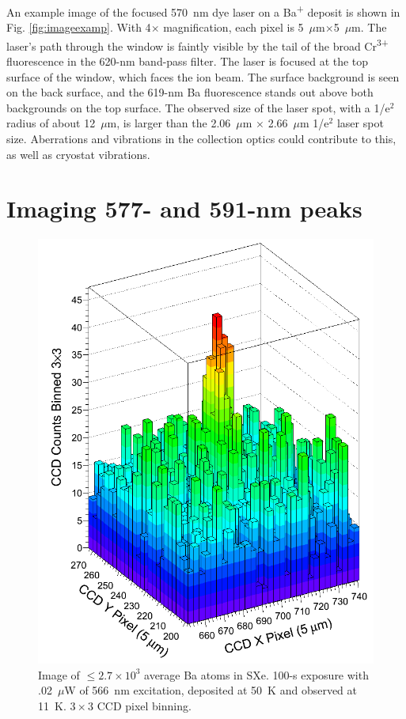 An example image of the focused 570~nm dye laser on a Ba\textsuperscript{+} deposit is shown in Fig. \ref{fig:imageexamp}.  With 4$\times$ magnification, each pixel is 5~$\mu$m$\times$5~$\mu$m.  The laser's path through the window is faintly visible by the tail of the broad Cr\textsuperscript{3+} fluorescence in the 620-nm band-pass filter.  The laser is focused at the top surface of the window, which faces the ion beam.  The surface background is seen on the back surface, and the 619-nm Ba fluorescence stands out above both backgrounds on the top surface.  The observed size of the laser spot, with a 1/e$^{2}$ radius of about 12~$\mu$m, is larger than the 2.06~$\mu$m $\times$ 2.66~$\mu$m 1/e$^{2}$ laser spot size.  Aberrations and vibrations in the collection optics could contribute to this, as well as cryostat vibrations.


\section{Imaging 577- and 591-nm peaks}
\label{sec:imaging590and577}

\begin{figure} %
        \centering
                \includegraphics[width=.6\textwidth]{figures/image_1e4.png}
                \caption{Image of $\leq 2.7 \times 10^{3}$ average Ba atoms in SXe.  100-s exposure with .02~$\mu$W of 566~nm excitation, deposited at 50~K and observed at 11~K.  $3 \times 3$ CCD pixel binning.}
\label{fig:image590s}
\end{figure}

